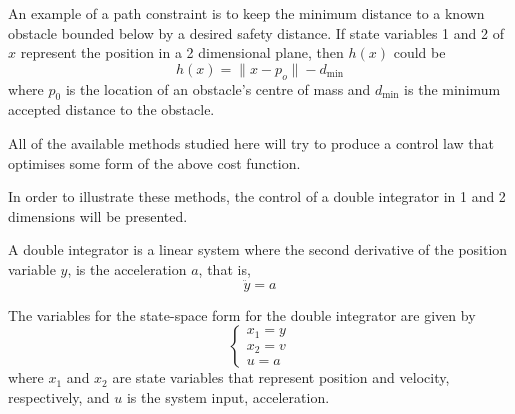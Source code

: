 \par An example of a path constraint is to keep the minimum distance to a known obstacle bounded below by a desired safety distance. If state variables 1 and 2 of $x$ represent the position in a 2 dimensional plane, then $h(x)$ could be
\begin{equation}
    \label{eq:example_constr}
    h(x) = \lVert x - p_o \rVert - d_{\text{min}}
\end{equation}
where $p_0$ is the location of an obstacle's centre of mass and $d_{\text{min}}$ is the minimum accepted distance to the obstacle.

\par All of the available methods studied here will try to produce a control law that optimises some form of the above cost function.

\par In order to illustrate these methods, the control of a double integrator in 1 and 2 dimensions will be presented.

\par A double integrator is a linear system where the second derivative of the position variable $y$, is the acceleration $a$, that is,
\begin{equation}
    \ddot{y} = a
    \label{eq:basic_double_int}
\end{equation}


\par The variables for the state-space form for the double integrator are given by
\begin{equation}
\begin{cases}
    x_1 = y \\ x_2 = v \\ u = a
\end{cases}
\end{equation}
where $x_1$ and $x_2$ are state variables that represent position and velocity, respectively, and $u$ is the system input, acceleration.

